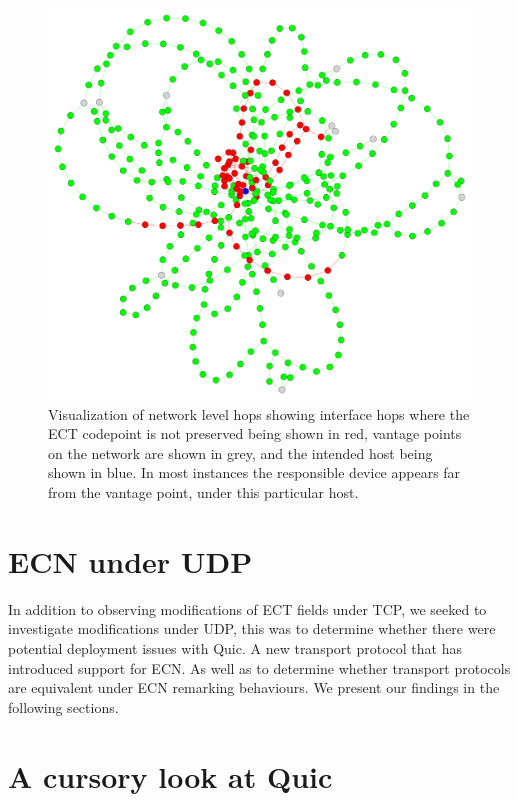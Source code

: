 \documentclass{l4proj}
\begin{document}
\begin{figure}[H]
    \centering
    \includegraphics[scale=0.1]{dissertation/images/hops.pdf}
    \caption{Visualization of network level hops showing interface hops where the ECT codepoint is not preserved being shown in red, vantage points on the network are shown in grey, and the intended host being shown in blue. In most instances the responsible device appears far from the vantage point, under this particular host.}
    \label{fig:traces}
\end{figure}


\section{ECN under UDP}

In addition to observing modifications of ECT fields under TCP, we seeked to investigate modifications under UDP, this was to determine whether there were potential deployment issues with Quic. A new transport protocol that has introduced support for ECN. As well as to determine whether transport protocols are equivalent under ECN remarking behaviours. We present our findings in the following sections.

\section{A cursory look at Quic}
\end{document}
